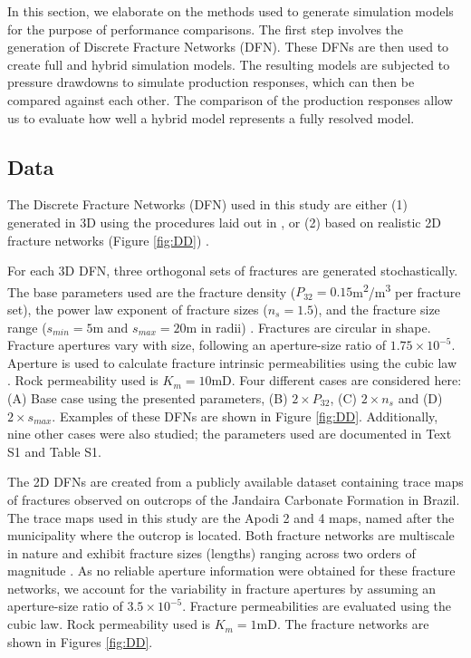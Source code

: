\documentclass[draft]{agujournal2018}
\begin{document}
In this section, we elaborate on the methods used to generate simulation models for the purpose of performance comparisons. The first step involves the generation of Discrete Fracture Networks (DFN). These DFNs are then used to create full and hybrid simulation models. The resulting models are subjected to pressure drawdowns to simulate production responses, which can then be compared against each other. The comparison of the production responses allow us to evaluate how well a hybrid model represents a fully resolved model.

\subsection{Data}
The Discrete Fracture Networks (DFN) used in this study are either (1) generated in 3D using the procedures laid out in \citet{Priest1993}, or (2) based on realistic 2D fracture networks (Figure \ref{fig:DD}) \citep{Bisdom2015, Bisdom2017}.

For each 3D DFN, three orthogonal sets of fractures are generated stochastically. The base parameters used are the fracture density ($P_{32}=0.15$m\textsuperscript{2}/m\textsuperscript{3} per fracture set), the power law exponent of fracture sizes ($n_s=1.5$), and the fracture size range ($s_{min}=5$m and $s_{max}=20$m in radii) \citep{Bonnet2001, Dershowitz1992}. Fractures are circular in shape. Fracture apertures vary with size, following an aperture-size ratio of $1.75\times 10^{-5}$. Aperture is used to calculate fracture intrinsic permeabilities using the cubic law \citep{Witherspoon1980}. Rock permeability used is $K_m=10$mD. Four different cases are considered here: (A) Base case using the presented parameters, (B) $2\times P_{32}$, (C) $2\times n_s$ and (D) $2\times s_{max}$. Examples of these DFNs are shown in Figure \ref{fig:DD}. Additionally, nine other cases were also studied; the parameters used are documented in Text S1 and Table S1.

The 2D DFNs are created from a publicly available dataset containing trace maps of fractures observed on outcrops of the Jandaira Carbonate Formation in Brazil. The trace maps used in this study are the Apodi 2 and 4 maps, named after the municipality where the outcrop is located. Both fracture networks are multiscale in nature and exhibit fracture sizes (lengths) ranging across two orders of magnitude \citep{Bisdom2015}. As no reliable aperture information were obtained for these fracture networks, we account for the variability in fracture apertures by assuming an aperture-size ratio of $3.5\times 10^{-5}$. Fracture permeabilities are evaluated using the cubic law. Rock permeability used is $K_m=1$mD. The fracture networks are shown in Figures \ref{fig:DD}.
\end{document}
